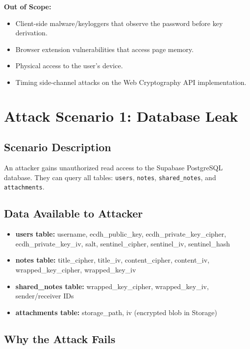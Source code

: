 \textbf{Out of Scope:}
\begin{itemize}
    \item Client-side malware/keyloggers that observe the password before key derivation.
    \item Browser extension vulnerabilities that access page memory.
    \item Physical access to the user's device.
    \item Timing side-channel attacks on the Web Cryptography API implementation.
\end{itemize}

\section{Attack Scenario 1: Database Leak}

\subsection{Scenario Description}

An attacker gains unauthorized read access to the Supabase PostgreSQL database. They can query all tables: \texttt{users}, \texttt{notes}, \texttt{shared\_notes}, and \texttt{attachments}.

\subsection{Data Available to Attacker}

\begin{itemize}
    \item \textbf{users table:} username, ecdh\_public\_key, ecdh\_private\_key\_cipher, ecdh\_private\_key\_iv, salt, sentinel\_cipher, sentinel\_iv, sentinel\_hash
    \item \textbf{notes table:} title\_cipher, title\_iv, content\_cipher, content\_iv, wrapped\_key\_cipher, wrapped\_key\_iv
    \item \textbf{shared\_notes table:} wrapped\_key\_cipher, wrapped\_key\_iv, sender/receiver IDs
    \item \textbf{attachments table:} storage\_path, iv (encrypted blob in Storage)
\end{itemize}

\subsection{Why the Attack Fails}

